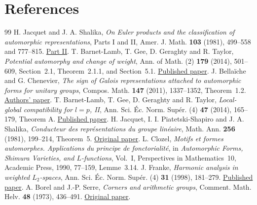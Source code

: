 \documentclass[a4paper,11pt]{article}
\theoremstyle{definition}
\theoremstyle{remark}
\numberwithin{equation}{section}
\begin{document}
\section{References}\label{nav:bibliography-XII}
\begingroup{}\begin{thebibliography}{99}\small
{} H. Jacquet and J. A. Shalika, \emph{On Euler products and the classification of automorphic representations}, Parts I and II, Amer. J. Math. \textbf{103} (1981), 499--558 and 777--815. \href{https://www.math.columbia.edu/~hj/On%20Euler%20products%20II.pdf}{Part II}.
 T. Barnet-Lamb, T. Gee, D. Geraghty and R. Taylor, \emph{Potential automorphy and change of weight}, Ann. of Math. (2) \textbf{179} (2014), 501--609, Section~2.1, Theorem~2.1.1, and Section~5.1. \href{https://annals.math.princeton.edu/2014/179-2/p03}{Published paper}.
 J. Bella\"iche and G. Chenevier, \emph{The sign of Galois representations attached to automorphic forms for unitary groups}, Compos. Math. \textbf{147} (2011), 1337--1352, Theorem~1.2. \href{https://gaetan.chenevier.perso.math.cnrs.fr/articles/sign.pdf}{Authors' paper}.
 T. Barnet-Lamb, T. Gee, D. Geraghty and R. Taylor, \emph{Local-global compatibility for \(l=p\), II}, Ann. Sci. \'Ec. Norm. Sup\'er. (4) \textbf{47} (2014), 165--179, Theorem A. \href{https://www.numdam.org/articles/10.24033/asens.2212/}{Published paper}.
 H. Jacquet, I. I. Piatetski-Shapiro and J. A. Shalika, \emph{Conducteur des repr\'esentations du groupe lin\'eaire}, Math. Ann. \textbf{256} (1981), 199--214, Theorem~5. \href{https://lesesvre.perso.math.cnrs.fr/newforms-references/jpss.pdf}{Original paper}.
 L. Clozel, \emph{Motifs et formes automorphes. Applications du principe de fonctorialit\'e}, in \emph{Automorphic Forms, Shimura Varieties, and \(L\)-functions}, Vol.~I, Perspectives in Mathematics~10, Academic Press, 1990, 77--159, Lemme~3.14.
 J. Franke, \emph{Harmonic analysis in weighted \(L_2\)-spaces}, Ann. Sci. \'Ec. Norm. Sup\'er. (4) \textbf{31} (1998), 181--279. \href{https://www.numdam.org/article/ASENS_1998_4_31_2_181_0.pdf}{Published paper}.
 A. Borel and J.-P. Serre, \emph{Corners and arithmetic groups}, Comment. Math. Helv. \textbf{48} (1973), 436--491. \href{https://www.e-periodica.ch/cntmng?pid=com-001:1973:48::32}{Original paper}.

\end{thebibliography}
\end{document}

